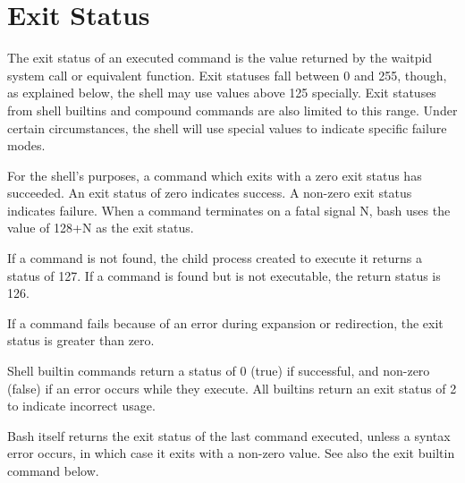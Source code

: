\section{Exit Status}\label{sec:exitstatus}
The exit status of an executed command is the value returned by the waitpid system call or equivalent function. Exit statuses fall between 0 and 255, though, as explained below, the shell may use values above 125 specially. Exit statuses from shell builtins and compound commands are also limited to this range. Under certain circumstances, the shell will use special values to indicate specific failure modes.

For the shell's purposes, a command which exits with a zero exit status has succeeded. An exit status of zero indicates success. A non-zero exit status indicates failure. When a command terminates on a fatal signal N, bash uses the value of 128+N as the exit status.

If a command is not found, the child process created to execute it returns a status of 127. If a command is found but is not executable, the return status is 126.

If a command fails because of an error during expansion or redirection, the exit status is greater than zero.

Shell builtin commands return a status of 0 (true) if successful, and non-zero (false) if an error occurs while they execute. All builtins return an exit status of 2 to indicate incorrect usage.

Bash itself returns the exit status of the last command executed, unless a syntax error occurs, in which case it exits with a non-zero value. See also the exit builtin command below.